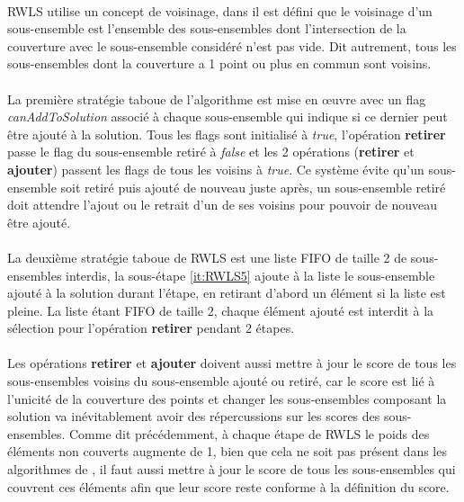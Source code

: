 \documentclass[a4paper,11pt,twoside,french,report]{../common/simplem}
\begin{document}
				\paragraph*{}
					\gls{RWLS} utilise un concept de voisinage, dans \cite{Gao2015} il est défini que le voisinage d'un sous-ensemble est l'ensemble des sous-ensembles dont l'intersection de la couverture avec le sous-ensemble considéré n'est pas vide. Dit autrement, tous les sous-ensembles dont la couverture a 1 point ou plus en commun sont voisins.
				\paragraph*{}
					La première stratégie taboue de l'algorithme est mise en œuvre avec un flag \textit{canAddToSolution} associé à chaque sous-ensemble qui indique si ce dernier peut être ajouté à la solution. Tous les flags sont initialisé à \textit{true}, l'opération \textbf{retirer} passe le flag du sous-ensemble retiré à \textit{false} et les 2 opérations (\textbf{retirer} et \textbf{ajouter}) passent les flags de tous les voisins à \textit{true}. Ce système évite qu'un sous-ensemble soit retiré puis ajouté de nouveau juste après, un sous-ensemble retiré doit attendre l'ajout ou le retrait d'un de ses voisins pour pouvoir de nouveau être ajouté.
				\paragraph*{}
					La deuxième stratégie taboue de \gls{RWLS} est une liste \gls{FIFO} de taille 2 de sous-ensembles interdis, la sous-étape \ref{it:RWLS5} ajoute à la liste le sous-ensemble ajouté à la solution durant l'étape, en retirant d'abord un élément si la liste est pleine. La liste étant \gls{FIFO} de taille 2, chaque élément ajouté est interdit à la sélection pour l'opération \textbf{retirer} pendant 2 étapes.
				\paragraph*{}
					Les opérations \textbf{retirer} et \textbf{ajouter} doivent aussi mettre à jour le score de tous les sous-ensembles voisins du sous-ensemble ajouté ou retiré, car le score est lié à l'unicité de la couverture des points et changer les sous-ensembles composant la solution va inévitablement avoir des répercussions sur les scores des sous-ensembles. Comme dit précédemment, à chaque étape de \gls{RWLS} le poids des éléments non couverts augmente de 1, bien que cela ne soit pas présent dans les algorithmes de \cite{Gao2015}, il faut aussi mettre à jour le score de tous les sous-ensembles qui couvrent ces éléments afin que leur score reste conforme à la définition du score.
\end{document}
